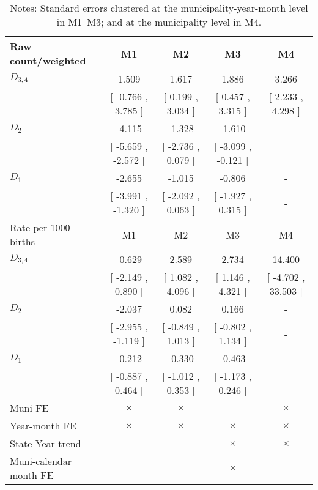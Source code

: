 \begin{table}[!ht]
\centering
\caption{Effects of Drought on anomalia}\label{tab:twfe_anomalia}
\fontsize{10pt}{12pt}\selectfont
\begin{tabular}{lcccc}
\toprule
  Raw count/weighted &\multicolumn{1}{c}{M1}&\multicolumn{1}{c}{M2}&\multicolumn{1}{c}{M3}&\multicolumn{1}{c}{M4} \\
\midrule
 $ D_{3,4} $ &     1.509 &     1.617 &     1.886 &     3.266 \\ 
 & [    -0.766 ,     3.785 ] & [     0.199 ,     3.034 ] & [     0.457 ,     3.315 ] & [     2.233 ,     4.298 ] \\ 
\addlinespace
 $ D_2 $ &    -4.115 &    -1.328 &    -1.610 & - \\ 
 & [    -5.659 ,    -2.572 ] & [    -2.736 ,     0.079 ] & [    -3.099 ,    -0.121 ] & - \\ 
\addlinespace
 $ D_1 $ &    -2.655 &    -1.015 &    -0.806 & - \\ 
 & [    -3.991 ,    -1.320 ] & [    -2.092 ,     0.063 ] & [    -1.927 ,     0.315 ] & - \\ 
\addlinespace
\midrule
  Rate per 1000 births &\multicolumn{1}{c}{M1}&\multicolumn{1}{c}{M2}&\multicolumn{1}{c}{M3}&\multicolumn{1}{c}{M4} \\
\midrule
 $ D_{3,4} $ &    -0.629 &     2.589 &     2.734 &    14.400 \\ 
 & [    -2.149 ,     0.890 ] & [     1.082 ,     4.096 ] & [     1.146 ,     4.321 ] & [    -4.702 ,    33.503 ] \\ 
\addlinespace
 $ D_2 $ &    -2.037 &     0.082 &     0.166 & - \\ 
 & [    -2.955 ,    -1.119 ] & [    -0.849 ,     1.013 ] & [    -0.802 ,     1.134 ] & - \\ 
\addlinespace
 $ D_1 $ &    -0.212 &    -0.330 &    -0.463 & - \\ 
 & [    -0.887 ,     0.464 ] & [    -1.012 ,     0.353 ] & [    -1.173 ,     0.246 ] & - \\ 
\midrule
  Muni FE & $ \times $ & $ \times $ &  & $ \times $  \\
  Year-month FE & $ \times $ & $ \times $ & $ \times $ & $ \times $ \\
  State-Year trend &  &  & $ \times $ & $ \times $ \\
  Muni-calendar month FE &  &  & $ \times $ & \\
\bottomrule
\end{tabular}
\caption*{\footnotesize{Notes: Standard errors clustered at the municipality-year-month level in M1--M3; and at the municipality level in M4.}}
\end{table}
